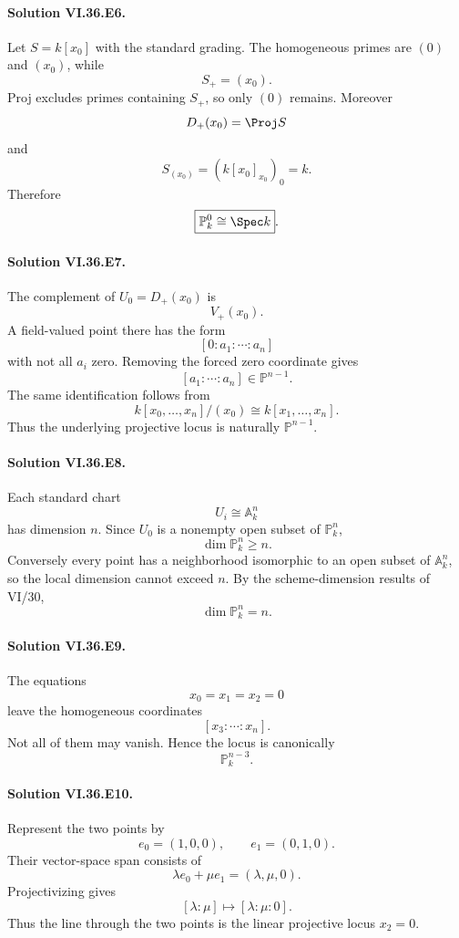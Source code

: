 \paragraph{Solution VI.36.E6.}
Let \(S=k[x_0]\) with the standard grading. The homogeneous primes are \((0)\) and \((x_0)\), while
\[
S_+=(x_0).
\]
Proj excludes primes containing \(S_+\), so only \((0)\) remains. Moreover
\[
D_+(x_0)=\Proj S
\]
and
\[
S_{(x_0)}=(k[x_0]_{x_0})_0=k.
\]
Therefore
\[
\boxed{\mathbb P^0_k\cong\Spec k}.
\]

\paragraph{Solution VI.36.E7.}
The complement of \(U_0=D_+(x_0)\) is
\[
V_+(x_0).
\]
A field-valued point there has the form
\[
[0:a_1:\cdots:a_n]
\]
with not all \(a_i\) zero. Removing the forced zero coordinate gives
\[
[a_1:\cdots:a_n]\in\mathbb P^{n-1}.
\]
The same identification follows from
\[
k[x_0,\ldots,x_n]/(x_0)\cong k[x_1,\ldots,x_n].
\]
Thus the underlying projective locus is naturally \(\mathbb P^{n-1}\).

\paragraph{Solution VI.36.E8.}
Each standard chart
\[
U_i\cong\mathbb A^n_k
\]
has dimension \(n\). Since \(U_0\) is a nonempty open subset of \(\mathbb P^n_k\),
\[
\dim\mathbb P^n_k\ge n.
\]
Conversely every point has a neighborhood isomorphic to an open subset of \(\mathbb A^n_k\), so the local
dimension cannot exceed \(n\). By the scheme-dimension results of VI/30,
\[
\boxed{\dim\mathbb P^n_k=n}.
\]

\paragraph{Solution VI.36.E9.}
The equations
\[
x_0=x_1=x_2=0
\]
leave the homogeneous coordinates
\[
[x_3:\cdots:x_n].
\]
Not all of them may vanish. Hence the locus is canonically
\[
\boxed{\mathbb P^{n-3}_k}.
\]

\paragraph{Solution VI.36.E10.}
Represent the two points by
\[
e_0=(1,0,0),
\qquad
e_1=(0,1,0).
\]
Their vector-space span consists of
\[
\lambda e_0+\mu e_1=(\lambda,\mu,0).
\]
Projectivizing gives
\[
\boxed{
[\lambda:\mu]\longmapsto[\lambda:\mu:0].
}
\]
Thus the line through the two points is the linear projective locus \(x_2=0\).

